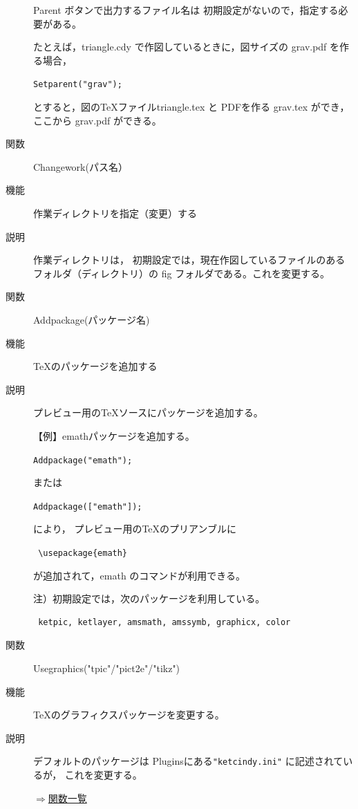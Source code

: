 \documentclass[papersize,a4paper,10pt,uplatex]{jsarticle}
\begin{document}
\begin{description}
Parent ボタンで出力するファイル名は 初期設定がないので，指定する必要がある。

たとえば，triangle.cdy で作図しているときに，図サイズの grav.pdf を作る場合，

\hspace{10mm} \verb|Setparent("grav");|

とすると，図のTeXファイルtriangle.tex と PDFを作る grav.tex ができ，ここから grav.pdf ができる。

\vspace{\baselineskip}
\hypertarget{changework}{}
\item[関数]Changework(パス名）
\item[機能]作業ディレクトリを指定（変更）する
\item[説明]作業ディレクトリは， 初期設定では，現在作図しているファイルのあるフォルダ（ディレクトリ）の fig フォルダである。これを変更する。

\vspace{\baselineskip}
\hypertarget{addpackage}{}
\item[関数]Addpackage(パッケージ名)
\item[機能]TeXのパッケージを追加する
\item[説明]プレビュー用のTeXソースにパッケージを追加する。 

\vspace{\baselineskip}
 【例】emathパッケージを追加する。
 
\hspace{10mm}\verb|Addpackage("emath"); | 
 
 または
 
\hspace{10mm}\verb|Addpackage(["emath"]); | 
 
 により，
プレビュー用のTeXのプリアンブルに

\hspace{10mm}\verb| \usepackage{emath}|

が追加されて，emath のコマンドが利用できる。

\vspace{\baselineskip}
注）初期設定では，次のパッケージを利用している。
\begin{verbatim}
 ketpic, ketlayer, amsmath, amssymb, graphicx, color 
 \end{verbatim}

\vspace{\baselineskip}
\hypertarget{usegraphics}{}
\item[関数]Usegraphics("tpic"/"pict2e"/"tikz")
\item[機能]TeXのグラフィクスパッケージを変更する。
\item[説明]デフォルトのパッケージは Pluginsにある\verb|"ketcindy.ini"| に記述されているが，
これを変更する。

\begin{flushright}\hyperlink{functionlist}{$\Rightarrow$関数一覧}\end{flushright}

\end{description}
\newpage
\end{document}
